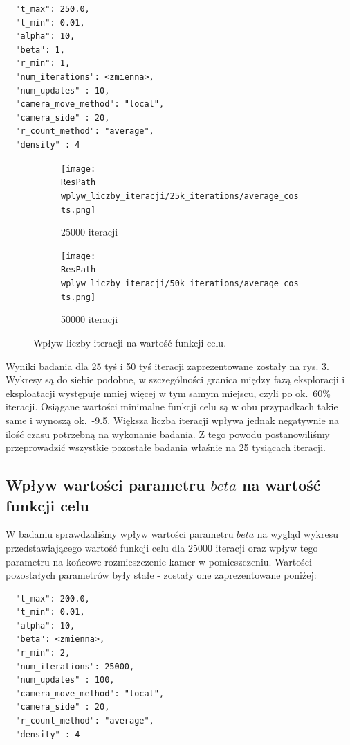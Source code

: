 \documentclass[12pt,a4paper]{article}
\newcommand{\ResPath}{../badania/}
\begin{document}
\begin{lstlisting}
  "t_max": 250.0,
  "t_min": 0.01,
  "alpha": 10,
  "beta": 1,
  "r_min": 1,
  "num_iterations": <zmienna>,
  "num_updates" : 10,
  "camera_move_method": "local",
  "camera_side" : 20,
  "r_count_method": "average",
  "density" : 4
\end{lstlisting}
\begin{figure}[htb]
  \begin{subfigure}[b]{0.5\linewidth}
    \centering
    \texttt{[image: \\ResPath wplyw\_liczby\_iteracji/25k\_iterations/average\_costs.png]} 
    \caption{25000 iteracji} 
    \label{fig_iterations:a} 
    \vspace{2ex}
  \end{subfigure}%
  \begin{subfigure}[b]{0.5\linewidth}
    \texttt{[image: \\ResPath wplyw\_liczby\_iteracji/50k\_iterations/average\_costs.png]} 
    \caption{50000 iteracji} 
    \label{fig_iterations:b} 
    \vspace{2ex}
  \end{subfigure} 
  \caption{Wpływ liczby iteracji na wartość funkcji celu.}
  \label{fig_iterations} 
\end{figure}
Wyniki badania dla 25 tyś i 50 tyś iteracji zaprezentowane zostały na rys. \ref{fig_iterations}. Wykresy są do siebie podobne, w szczególności granica między
fazą eksploracji i eksploatacji występuje mniej więcej w tym samym miejscu, czyli
po ok.\ 60\% iteracji. Osiągane wartości minimalne funkcji celu są w obu
przypadkach takie same i wynoszą ok.\ -9.5. Większa liczba iteracji wpływa jednak
negatywnie na ilość czasu potrzebną na wykonanie badania. Z tego powodu
postanowiliśmy przeprowadzić wszystkie pozostałe badania właśnie na 25 tysiącach iteracji.

\subsection{Wpływ wartości parametru $beta$ na wartość funkcji celu}
W badaniu sprawdzaliśmy wpływ wartości parametru $beta$ na wygląd wykresu
przedstawiającego wartość funkcji celu dla 25000 iteracji oraz wpływ tego
parametru na końcowe rozmieszczenie kamer w pomieszczeniu. Wartości pozostałych
parametrów były stałe - zostały one zaprezentowane poniżej:

\begin{lstlisting}
  "t_max": 200.0,
  "t_min": 0.01,
  "alpha": 10,
  "beta": <zmienna>,
  "r_min": 2,
  "num_iterations": 25000,
  "num_updates" : 100,
  "camera_move_method": "local",
  "camera_side" : 20,
  "r_count_method": "average",
  "density" : 4
\end{lstlisting}
\end{document}

